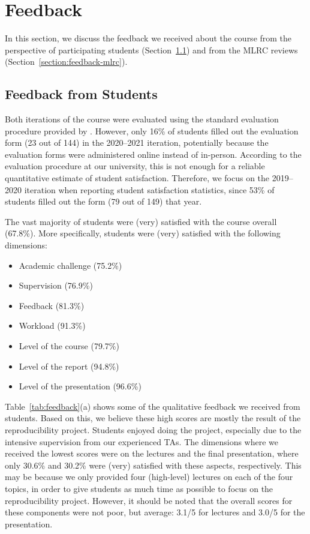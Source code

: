 
\section{Feedback}
\label{section:feedback}

In this section, we discuss the feedback we received about the course from the perspective of participating students (Section~\ref{section:feedback-students}) and from the MLRC reviews (Section~\ref{section:feedback-mlrc}). 
 
\subsection{Feedback from Students}
\label{section:feedback-students}
Both iterations of the course were evaluated using the standard evaluation procedure provided by \OurUniversity. 
However, only 16\% of students filled out the evaluation form (23 out of 144) in the 2020--2021 iteration, potentially because the evaluation forms were administered online instead of in-person. 
According to the evaluation procedure at our university, this is not enough for a reliable quantitative estimate of student satisfaction.
Therefore, we focus on the 2019--2020 iteration when reporting student satisfaction statistics, since 53\% of students filled out the form (79 out of 149) that year. 

The vast majority of students were (very) satisfied with the course overall (67.8\%). 
More specifically, students were (very) satisfied with the following dimensions: 
\begin{itemize}[leftmargin=*,nosep]
    \item Academic challenge (75.2\%)
    \item Supervision (76.9\%)
    \item Feedback (81.3\%)
    \item Workload (91.3\%)
    \item Level of the course (79.7\%)
    \item Level of the report (94.8\%)
    \item Level of the presentation (96.6\%)
\end{itemize}
Table~\ref{tab:feedback}(a) shows some of the qualitative feedback we received from students. 
Based on this, we believe these high scores are mostly the result of the reproducibility project. 
Students enjoyed doing the project, especially due to the intensive supervision from our experienced TAs. 
The dimensions where we received the lowest scores were on the lectures and the final presentation, where only 30.6\% and 30.2\% were (very) satisfied with these aspects, respectively. 
This may be because we only provided four (high-level) lectures on each of the four topics, in order to give students as much time as possible to focus on the reproducibility project. 
However, it should be noted that the overall scores for these components were not poor, but average: 3.1/5 for lectures and 3.0/5 for the presentation. 

